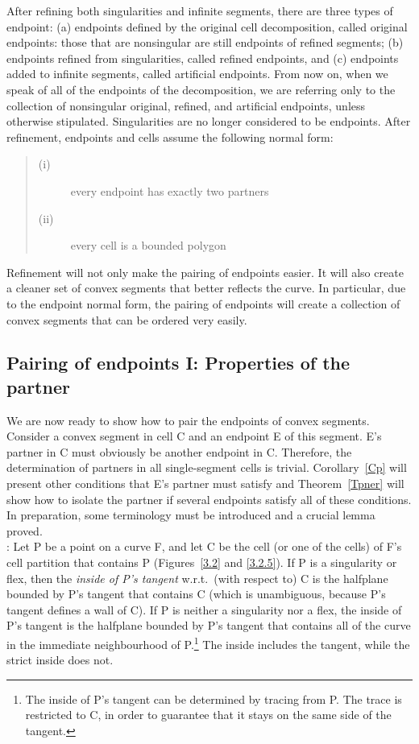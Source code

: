 After refining both singularities and infinite segments, there are 
three types of endpoint: 
(a) endpoints defined by the original cell decomposition, called original
endpoints: those that are nonsingular are still endpoints of refined
segments;
(b) endpoints refined from singularities, called refined endpoints,
and (c) endpoints added to infinite segments, called artificial endpoints.
From now on, when we speak of all of the endpoints of the decomposition, 
we are referring only to the collection of 
nonsingular original, refined, and artificial endpoints, 
unless otherwise stipulated.
Singularities are no longer considered to be endpoints.
After refinement, endpoints and cells assume the following normal form:
\begin{quote}
\begin{description}
\item[(i)]
	 every endpoint has exactly two partners
\nopagebreak
\item[(ii)]
	 every cell is a bounded polygon
\end{description}
\end{quote}
Refinement will not only make the pairing of endpoints easier.
It will also create
a cleaner set of convex segments that better reflects the curve.
In particular, due to the endpoint normal form, the pairing of endpoints 
will create a collection of convex segments that can be ordered very easily.

\subsection{Pairing of endpoints I: Properties of the partner}
\label{ssp}

We are now ready to show how to pair the endpoints of convex segments.
Consider a convex segment in cell C and an endpoint E of this segment.
E's partner in C must obviously be another endpoint in C.
Therefore, the determination of partners in all single-segment cells is trivial.
Corollary~\ref{Cp} will present other conditions that E's partner must satisfy
and Theorem~\ref{Tpner} will show how to isolate the partner if several endpoints
satisfy all of these conditions.
In preparation, some terminology must be introduced and a crucial lemma proved.
\\[3pt]
%
%
:
Let P be a point on a curve F, and let C be the cell (or one
of the cells) of F's cell partition that contains P 
(Figures~\ref{3.2} and \ref{3.2.5}).
If P is a singularity or flex, then the 
{\em inside of P's tangent} w.r.t.\ (with respect to) C is the 
halfplane bounded by P's tangent that contains C (which is unambiguous, because P's 
tangent defines a wall of C).  
If P is neither a singularity nor a flex, 
the inside of P's tangent is the halfplane bounded by P's tangent that 
contains all of the curve in the immediate neighbourhood of P.\footnote{The 
	inside of P's tangent
	can be determined by tracing from P.
	The trace is restricted to C,
	in order to guarantee that it stays on the same side of the tangent.}
The inside includes the tangent, while the strict inside does not.

